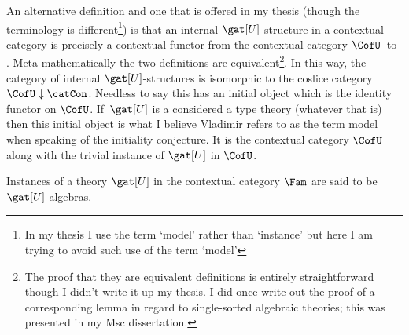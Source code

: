 \begin{oldtt}
\note 
An alternative definition and one that is offered  in my thesis 
(though the terminology is different\footnote{In my thesis I use the term `model' rather than `instance'  but here I am trying to avoid such use of the term `model'}) is that an internal $\gat[U]$-structure in a contextual category \catcw is precisely 
a contextual functor from the contextual category $\CofU$\  to \catc. 
Meta-mathematically the two definitions are equivalent\footnote{The proof that they are equivalent 
definitions is entirely straightforward though I didn't write it up my thesis. I did once write out the proof of a  corresponding lemma in regard to single-sorted algebraic theories; this was presented in my Msc dissertation.}.
\note
In this way, the category of internal $\gat[U]$-structures  is isomorphic to the coslice category
$\CofU \downarrow \catCon$. Needless to say this has an initial object which is the identity functor on  $\CofU$.
If\ $\gat[U]$ is a considered a type theory (whatever that is) then this initial object is what I believe Vladimir refers
to as the term model when speaking of the initiality conjecture. It is the contextual category
$\CofU$ along with the trivial instance of $\gat[U]$ in $\CofU$.

\note 
Instances of a theory $\gat[U]$ in the contextual category $\Fam$ are said to be $\gat[U]$-algebras. 
\end{oldtt}


